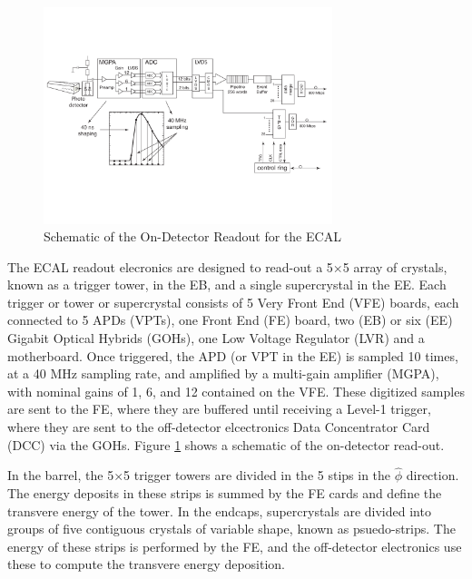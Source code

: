 \begin{figure}[h]
   \centering
  \includegraphics[width=0.75\textwidth]{Figures/CMS_Diagrams/ECAL__OnDetectorReadOut.pdf}
  \caption{Schematic of the On-Detector Readout for the ECAL } \label{fig:ecal_readout}
\end{figure}

\par The ECAL readout elecronics are designed to read-out a 5$\times$5
array of crystals, known as a trigger tower, in the EB, and a single
supercrystal in the EE.  Each trigger or tower or supercrystal
consists of 5 Very Front End (VFE) boards, each connected to 5 APDs
(VPTs), one Front End (FE) board, two (EB) or six (EE) Gigabit Optical
Hybrids (GOHs), one Low Voltage Regulator (LVR) and a motherboard.
Once triggered, the APD (or VPT in the EE) is sampled 10 times, at a
40 MHz sampling rate, and amplified by a multi-gain amplifier (MGPA),
with nominal gains of 1, 6, and 12 contained on the VFE.  These
digitized samples are sent to the FE, where they are buffered until
receiving a Level-1 trigger, where they are sent to the off-detector
elcectronics Data Concentrator Card (DCC) via the GOHs.  Figure
\ref{fig:ecal_readout} shows a schematic of the on-detector read-out. 

\par In the barrel, the 5$\times$5 trigger towers are divided in the 5
stips in the $\hat{\phi}$ direction.  The energy deposits in these
strips is summed by the FE cards and define the transvere energy of
the tower.  In the endcaps, supercrystals are divided into groups of
five contiguous crystals of variable shape, known as
psuedo-strips. The energy of these strips is performed by the FE, and
the off-detector electronics use these to compute the transvere energy
deposition.  

